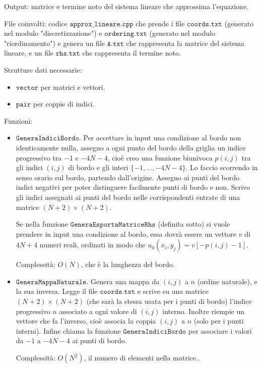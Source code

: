 \documentclass{article}
\begin{document}
Output: matrice e termine noto del sistema lineare che approssima l'equazione.

File coinvolti: codice $\texttt{approx\_lineare.cpp}$ che prende i file $\texttt{coords.txt}$ (generato nel modulo "discretizzazione") e $\texttt{ordering.txt}$ (generato nel modulo "riordinamento") e  genera un file $\texttt{A.txt}$ che rappresenta la matrice del sistema lineare, e un file $\texttt{rhs.txt}$ che rappresenta il termine noto.

Strutture dati necessarie: 
\begin{itemize}
\item $\texttt{vector}$ per matrici e vettori.
\item $\texttt{pair}$ per coppie di indici.
\end{itemize}

Funzioni:
\begin{itemize}
\item $\texttt{GeneraIndiciBordo}$.
Per accettare in input una condizione al bordo non identicamente nulla, assegno a ogni punto del bordo della griglia un indice progressivo tra $-1$ e $-4N-4$, cioè creo una funzione biunivoca $p(i,j)$ tra gli indici $(i,j)$ di bordo e gli interi $\{-1, \dots, -4N-4\}$.
Lo faccio scorrendo in senso orario sul bordo, partendo dall'origine.
Assegno ai punti del bordo indici negativi per poter distinguere facilmente punti di bordo e non.
Scrivo gli indici assegnati ai punti del bordo nelle corrispondenti entrate di una matrice $(N+2) \times (N+2)$.

Se nella funzione $\texttt{GeneraEsportaMatriceRhs}$ (definita sotto) si vuole prendere in input una condizione al bordo, essa dovrà essere un vettore $v$ di $4N+4$ numeri reali, ordinati in modo che $u_0(x_i,y_j) = v[-p(i,j) - 1]$.

Complessità: $O(N)$, che è la lunghezza del bordo.

\item $\texttt{GeneraMappaNaturale}$.
Genera una mappa da $(i,j)$ a $n$ (ordine naturale), e la sua inversa.
Legge il file $\texttt{coords.txt}$ e scrive su una matrice $(N+2)\times (N+2)$ (che sarà la stessa usata per i punti di bordo) l'indice progressivo $n$ associato a ogni valore di $(i,j)$ interno.
Inoltre riempie un vettore che fa l'inverso, cioè associa la coppia $(i,j)$ a $n$ (solo per i punti interni).
Infine chiama la funzione $\texttt{GeneraIndiciBordo}$ per associare i valori da $-1$ a $-4N-4$ ai punti di bordo.

Complessità: $O(N^2)$, il numero di elementi nella matrice..


\end{itemize}
\end{document}
